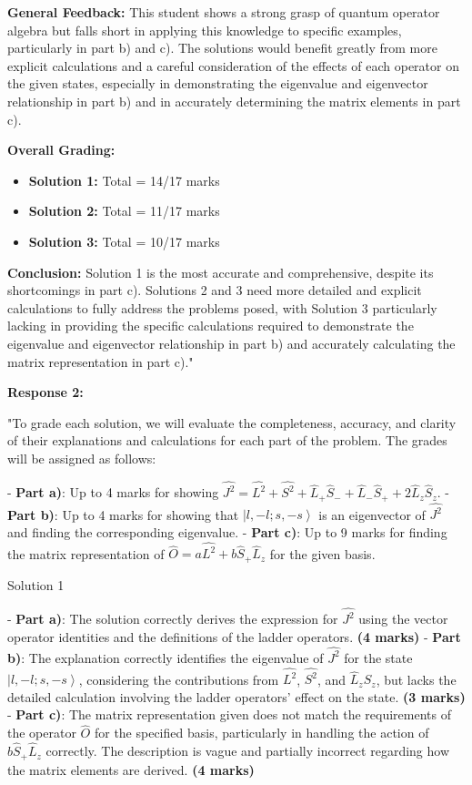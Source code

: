 \documentclass[a4paper,11pt]{article}
\begin{document}
\textbf{General Feedback:} This student shows a strong grasp of quantum operator algebra but falls short in applying this knowledge to specific examples, particularly in part b) and c). The solutions would benefit greatly from more explicit calculations and a careful consideration of the effects of each operator on the given states, especially in demonstrating the eigenvalue and eigenvector relationship in part b) and in accurately determining the matrix elements in part c).

\textbf{Overall Grading:}

\begin{itemize}
    \item \textbf{Solution 1:} Total = 14/17 marks
    \item \textbf{Solution 2:} Total = 11/17 marks
    \item \textbf{Solution 3:} Total = 10/17 marks
\end{itemize}

\textbf{Conclusion:} Solution 1 is the most accurate and comprehensive, despite its shortcomings in part c). Solutions 2 and 3 need more detailed and explicit calculations to fully address the problems posed, with Solution 3 particularly lacking in providing the specific calculations required to demonstrate the eigenvalue and eigenvector relationship in part b) and accurately calculating the matrix representation in part c)."

\textbf{Response 2:}

"To grade each solution, we will evaluate the completeness, accuracy, and clarity of their explanations and calculations for each part of the problem. The grades will be assigned as follows:

- \textbf{Part a)}: Up to 4 marks for showing \( \hat{J^{2}} = \hat{L^{2}} + \hat{S^{2}} + \hat{L}_{+}\hat{S}_{-} + \hat{L}_{-}\hat{S}_{+} + 2\hat{L}_{z}\hat{S}_{z} \).
- \textbf{Part b)}: Up to 4 marks for showing that \( \left|l, -l; s, -s \right> \) is an eigenvector of \( \hat{J^{2}} \) and finding the corresponding eigenvalue.
- \textbf{Part c)}: Up to 9 marks for finding the matrix representation of \( \hat{O} = a\hat{L^{2}} + b\hat{S}_{+}\hat{L}_{z} \) for the given basis.

Solution 1

- \textbf{Part a)}: The solution correctly derives the expression for \( \hat{J^{2}} \) using the vector operator identities and the definitions of the ladder operators. \textbf{(4 marks)}
- \textbf{Part b)}: The explanation correctly identifies the eigenvalue of \( \hat{J^{2}} \) for the state \( \left|l, -l; s, -s \right> \), considering the contributions from \( \hat{L^{2}} \), \( \hat{S^{2}} \), and \( \hat{L}_{z}\hat{S}_{z} \), but lacks the detailed calculation involving the ladder operators' effect on the state. \textbf{(3 marks)}
- \textbf{Part c)}: The matrix representation given does not match the requirements of the operator \( \hat{O} \) for the specified basis, particularly in handling the action of \( b\hat{S}_{+}\hat{L}_{z} \) correctly. The description is vague and partially incorrect regarding how the matrix elements are derived. \textbf{(4 marks)}
\end{document}
